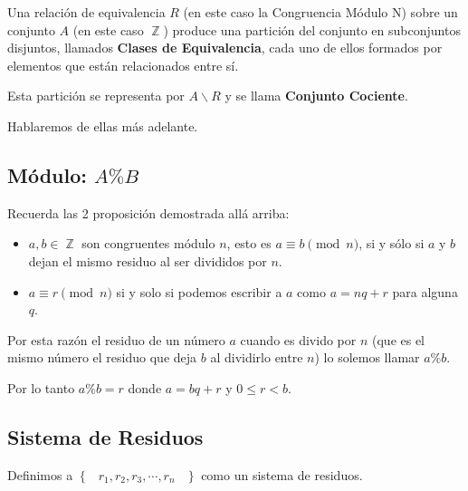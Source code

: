 \documentclass[12pt, fleqn]{report}                             %
\DeclareMathOperator \Space {\quad}                             %
\DeclareMathOperator \MiniSpace {\;}                            %
\newcommand{\Set}[1]{\left\{ \MiniSpace #1 \MiniSpace \right\}} %
\DeclareMathOperator \Integers  {\mathbb{Z}}                     %
\begin{document}
            Una relación de equivalencia $R$ (en este caso la Congruencia Módulo N)
            sobre un conjunto $A$ (en este caso $\Integers$) produce una partición
            del conjunto en subconjuntos disjuntos, llamados \textbf{Clases de
            Equivalencia}, cada uno de ellos formados por elementos que están
            relacionados entre sí.

            Esta partición se representa por $A \backslash R$ y se llama
            \textbf{Conjunto Cociente}.

            Hablaremos de ellas más adelante.


        \clearpage
        \subsection{Módulo: $A \% B$}

            Recuerda las 2 proposición demostrada allá arriba:

            \begin{itemize}
                \item $a,b \in \Integers$ son congruentes módulo $n$,
                    esto es $a \equiv b \pmod{n}$, si y sólo si $a$ y $b$
                    dejan el mismo residuo al ser divididos por $n$.

                \item $a \equiv r \pmod{n}$ si y solo si podemos escribir
                    a $a$ como $a=nq+r$ para alguna $q$.
             \end{itemize} 

            Por esta razón el residuo de un número $a$ cuando es divido por $n$
            (que es el mismo número el residuo que deja $b$ al dividirlo entre $n$)
            lo solemos llamar $a \% b$.


            Por lo tanto $a \% b = r$ donde $a =bq+r$ y $0 \leq r < b$.


        \subsection{Sistema de Residuos}

            Definimos a $\Set{r_1, r_2, r_3, \cdots, r_n}$ como un sistema
            de residuos.
\end{document}

